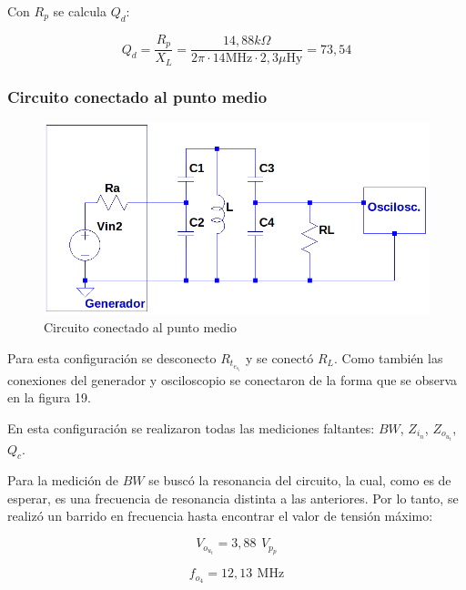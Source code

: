 Con \(R_p\) se calcula \(Q_d\):

\begin{equation}
    Q_d = \frac{R_p}{X_L} = \frac{14,88k\Omega}{2\pi \cdot 14 \text{MHz} \cdot 2,3\mu \text{Hy}} = \boxed{73,54} 
\end{equation}

\newpage

\subsubsection{Circuito conectado al punto medio}

\begin{figure}[!h]
    \centering
    \includegraphics[scale=0.4]{Imagenes/Circptomedio.png}
    \caption{Circuito conectado al punto medio}
    \label{fig:Circrp}
\end{figure}

Para esta configuración se desconecto \(R_t_e_s_t\) y se conectó \(R_L\). Como también las conexiones del generador y osciloscopio se conectaron de la forma que se observa en la figura 19.

En esta configuración se realizaron todas las mediciones faltantes: \(BW\), \(Z_i_n\), \(Z_o_u_t\), \(Q_c\).

Para la medición de \(BW\) se buscó la resonancia del circuito, la cual, como es de esperar, es una frecuencia de resonancia distinta a las anteriores. Por lo tanto, se realizó un barrido en frecuencia hasta encontrar el valor de tensión máximo:


\begin{equation}
    V_o_u_t = 3,88 \,\ V_p_p
\end{equation}

\begin{equation}
    f_o_4 = 12,13 \,\ \text{MHz}
\end{equation}



